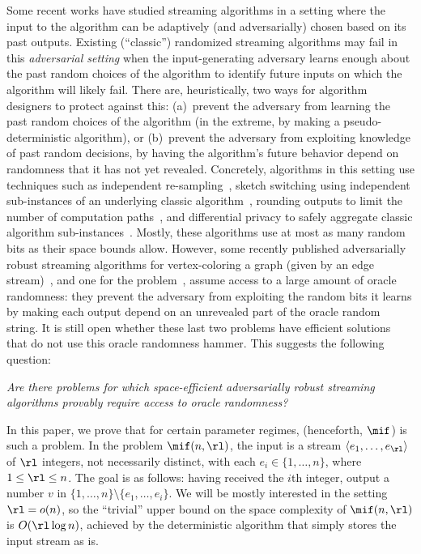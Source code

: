 Some recent works have studied streaming algorithms in a setting where the
input to the algorithm can be adaptively (and adversarially) chosen based on
its past outputs. Existing (``classic'') randomized streaming algorithms may
fail in this {\em adversarial setting} when the input-generating adversary
learns enough about the past random choices of the algorithm to identify
future inputs on which the algorithm will likely fail. There are,
heuristically, two ways for algorithm designers to protect against this:
(a)~prevent the adversary from learning the past random choices of the
algorithm (in the extreme, by making a pseudo-deterministic algorithm), or
(b)~prevent the adversary from exploiting knowledge of past random decisions,
by having the algorithm's future behavior depend on randomness that it has not
yet revealed. Concretely, algorithms in this setting use techniques such as
independent re-sampling~\cite{BenEliezerY20}, sketch switching using
independent sub-instances of an underlying classic
algorithm~\cite{BenEliezerJWY20}, rounding outputs to limit the number of
computation paths~\cite{BenEliezerJWY20}, and differential privacy to safely
aggregate classic algorithm sub-instances~\cite{HassidimKMMS20}. Mostly, these
algorithms use at most as many random bits as their space bounds allow.
However, some recently published adversarially robust streaming algorithms for
vertex-coloring a graph (given by an edge stream)~\cite{ChakrabartiGS22,
AssadiCGS23}, and one for the \miflong problem~\cite{Stoeckl23}, assume access
to a large amount of oracle randomness: they prevent the adversary from
exploiting the random bits it learns by making each output depend on an
unrevealed part of the oracle random string. It is still open whether these
last two problems have efficient solutions that do not use this oracle
randomness hammer. This suggests the following question: 

\begin{center}\begin{minipage}{.75\linewidth}\begin{center}
  \emph{Are there problems for which space-efficient adversarially robust
  streaming algorithms provably require access to oracle randomness?}
\end{center}\end{minipage}\end{center}

In this paper, we prove that for certain parameter regimes, \miflong
(henceforth, $\mif$) is such a problem. In the problem $\mif(n,\rl)$, the
input is a stream $\langle e_1,\ldots,e_\rl \rangle$ of $\rl$ integers, not
necessarily distinct, with each $e_i \in \{1,\ldots,n\}$, where $1 \le \rl \le
n$. The goal is as follows: having received the $i$th integer, output a number
$v$ in $\{1,\ldots,n\} \setminus \{e_1,\ldots,e_i\}$.  We will be mostly interested in the setting $\rl = o(n)$, so
the ``trivial'' upper bound on the space complexity of $\mif(n,\rl)$ is
$O(\rl \log n)$, achieved by the deterministic algorithm that simply stores
the input stream as is.

